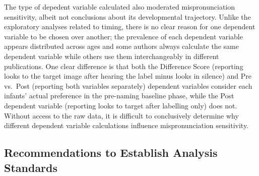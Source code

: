 \documentclass[
  man, noextraspace]{apa6}
\begin{document}
The type of depedent variable calculated also moderated mispronunciation sensitivity, albeit not conclusions about its developmental trajectory. Unlike the exploratory analyses related to timing, there is no clear reason for one dependent variable to be chosen over another; the prevalence of each dependent variable appears distributed across ages and some authors always calculate the same dependent variable while others use them interchangeably in different publications. One clear difference is that both the Difference Score (reporting looks to the target image after hearing the label minus looks in silence) and Pre vs.~Post (reporting both variables separately) dependent variables consider each infants' actual preference in the pre-naming baseline phase, while the Post dependent variable (reporting looks to target after labelling only) does not. Without access to the raw data, it is difficult to conclusively determine why different dependent variable calculations influence mispronunciation sensitivity.

\hypertarget{recommendations-to-establish-analysis-standards}{%
\subsection{Recommendations to Establish Analysis Standards}\label{recommendations-to-establish-analysis-standards}}
\end{document}
